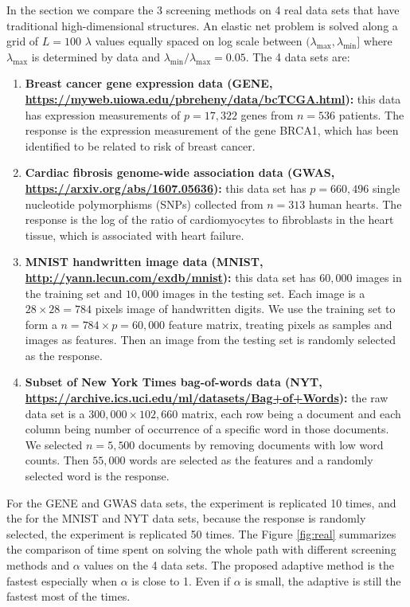 In the section we compare the 3 screening methods on 4 real data sets that have traditional high-dimensional structures. An elastic net problem is solved along a grid of $L=100$ $\lambda$ values equally spaced on log scale between $(\lambda_{\max},\lambda_{\min}]$ where $\lambda_{\max}$ is determined by data and $\lambda_{\min}/\lambda_{\max}=0.05$. The 4 data sets are:

\begin{enumerate}
    \item \textbf{Breast cancer gene expression data
(GENE, \url{https://myweb.uiowa.edu/pbreheny/data/bcTCGA.html}):} this data has expression measurements of $p=17,322$ genes from $n=536$ patients. The response is the expression measurement of the gene BRCA1, which has been identified to be related to risk of breast cancer.
    \item \textbf{Cardiac fibrosis genome-wide association data
(GWAS, \url{https://arxiv.org/abs/1607.05636}):} this data set has $p=660,496$ single nucleotide
polymorphisms (SNPs) collected from $n=313$ human hearts. The response is the log of the ratio of cardiomyocytes to fibroblasts in the heart tissue, which is associated with heart failure.
    \item \textbf{MNIST handwritten image data
(MNIST, \url{http://yann.lecun.com/exdb/mnist}):} this data set has $60,000$ images in the training set and $10,000$ images in the testing set. Each image is a $28\times 28=784$ pixels image of handwritten digits. We use the training set to form a $n=784\times p=60,000$ feature matrix, treating pixels as samples and images as features. Then an image from the testing set is randomly selected as the response.
    \item \textbf{Subset of New York Times bag-of-words data
(NYT, \url{https://archive.ics.uci.edu/ml/datasets/Bag+of+Words}):} the raw data set is a $300,000\times 102,660$ matrix, each row being a document and each column being number of occurrence of a specific word in those documents. We selected $n=5,500$ documents by removing documents with low word counts. Then $55,000$ words are selected as the features and a randomly selected word is the response.
\end{enumerate}

For the GENE and GWAS data sets, the experiment is replicated 10 times, and the for the MNIST and NYT data sets, because the response is randomly selected, the experiment is replicated 50 times. The Figure \ref{fig:real} summarizes the comparison of time spent on solving the whole path with different screening methods and $\alpha$ values on the 4 data sets. The proposed adaptive method is the fastest especially when $\alpha$ is close to 1. Even if $\alpha$ is small, the adaptive is still the fastest most of the times.

